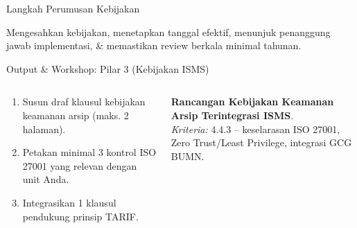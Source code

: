 \documentclass[aspectratio=169,11pt]{beamer}
\begin{document}
\begin{frame}{Langkah Perumusan Kebijakan}
    \vspace{0.2cm}
    \centering
    
    \vspace{0.3cm}
    \begin{premiumbox}
        \small
        Mengesahkan kebijakan, menetapkan tanggal efektif, menunjuk penanggung jawab implementasi, \& memastikan review berkala minimal tahunan.
    \end{premiumbox}
\end{frame}

\begin{frame}{Output \& Workshop: Pilar 3 (Kebijakan ISMS)}
    \vspace{0.2cm}
    \begin{columns}[T]
        \begin{premiumbox}
            \scriptsize
            \begin{enumerate}
                \item Susun draf klausul kebijakan keamanan arsip (maks. 2 halaman).
                \item Petakan minimal 3 kontrol ISO 27001 yang relevan dengan unit Anda.
                \item Integrasikan 1 klausul pendukung prinsip TARIF.
            \end{enumerate}
        \end{premiumbox}
        
        \begin{greenbox}[Portofolio 3]
            \scriptsize
            \textbf{Rancangan Kebijakan Keamanan Arsip Terintegrasi ISMS}.\\[0.1cm]
            \textit{Kriteria:} 4.4.3 -- keselarasan ISO 27001, Zero Trust/Least Privilege, integrasi GCG BUMN.
        \end{greenbox}
    \end{columns}
\end{frame}
\end{document}
